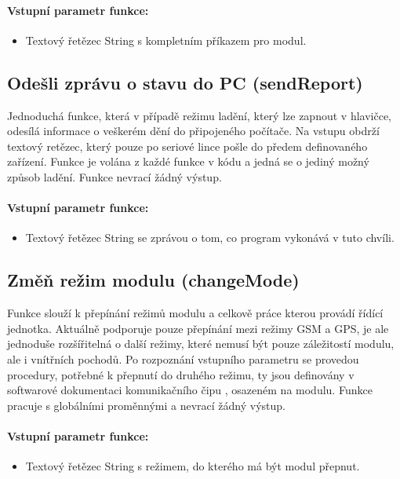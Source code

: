 \documentclass[FM,BP]{tulthesis}  %
\begin{document}
\paragraph{Vstupní parametr funkce:}
\begin{itemize}
\item Textový řetězec String s kompletním příkazem pro modul.
\end{itemize}

\subsection{Odešli zprávu o stavu do PC (sendReport)}
Jednoduchá funkce, která v případě režimu ladění, který lze zapnout v hlavičce, odesílá informace o veškerém dění do připojeného počítače. Na vstupu obdrží textový retězec, který pouze po seriové lince pošle do předem definovaného zařízení. Funkce je volána z každé funkce v kódu a jedná se o jediný možný způsob ladění. Funkce nevrací žádný výstup.

\paragraph{Vstupní parametr funkce:}
\begin{itemize}
\item Textový řetězec String se zprávou o tom, co program vykonává v tuto chvíli.
\end{itemize}

\subsection{Změň režim modulu (changeMode)}
Funkce slouží k přepínání režimů modulu a celkově práce kterou provádí řídící jednotka. Aktuálně podporuje pouze přepínání mezi režimy GSM a GPS, je ale jednoduše rozšířitelná o další režimy, které nemusí být pouze záležitostí modulu, ale i vnítřních pochodů. Po rozpoznání vstupního parametru se provedou procedury, potřebné k přepnutí do druhého režimu, ty jsou definovány v softwarové dokumentaci komunikačního čipu \cite{SIMCOM SW}, osazeném na modulu. Funkce pracuje s globálními proměnnými a nevrací žádný výstup.

\paragraph{Vstupní parametr funkce:}
\begin{itemize}
\item Textový řetězec String s režimem, do kterého má být modul přepnut.
\end{itemize}
\end{document}
